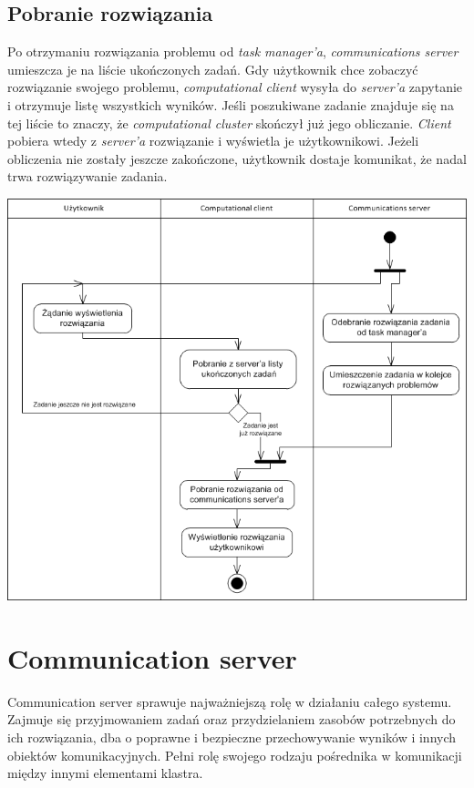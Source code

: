 \documentclass[12pt,a4paper,titlepage]{report}
\begin{document}
	\section{Pobranie rozwiązania}	
	Po otrzymaniu rozwiązania problemu od \emph{task manager'a}, \emph{communications server} umieszcza je na liście ukończonych zadań. Gdy użytkownik chce zobaczyć rozwiązanie swojego problemu, \emph{computational client} wysyła do \emph{server'a} zapytanie i otrzymuje listę wszystkich wyników. Jeśli poszukiwane zadanie znajduje się na tej liście to znaczy, że \emph{computational cluster} skończył już jego obliczanie. \emph{Client} pobiera wtedy z \emph{server'a} rozwiązanie i wyświetla je użytkownikowi. Jeżeli obliczenia nie zostały jeszcze zakończone, użytkownik dostaje komunikat, że nadal trwa rozwiązywanie zadania.
	
	\includegraphics[width=\textwidth]{img/activityDiagramClient2.png}
	
\chapter{Communication server}
		Communication server sprawuje najważniejszą rolę w działaniu całego systemu. Zajmuje się
		przyjmowaniem zadań oraz przydzielaniem zasobów potrzebnych do ich rozwiązania,
		dba o poprawne i bezpieczne przechowywanie wyników i innych obiektów komunikacyjnych.
		Pełni rolę swojego rodzaju pośrednika w komunikacji między innymi elementami klastra.
		
\end{document}
